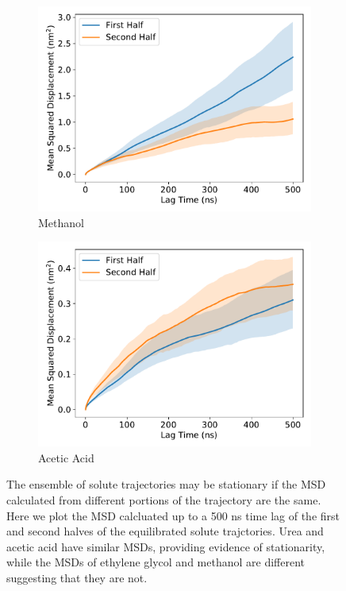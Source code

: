 \documentclass{article}
\begin{document}
\begin{figure}
\begin{subfigure}{0.45\textwidth}
  \end{subfigure}
  \begin{subfigure}{0.45\textwidth}
  \includegraphics[width=\textwidth]{MET_MSD_halves.pdf}
  \caption{Methanol}\label{fig:MET_MSD_halves}
  \end{subfigure}
  \begin{subfigure}{0.45\textwidth}
  \includegraphics[width=\textwidth]{ACH_MSD_halves.pdf}
  \caption{Acetic Acid}\label{fig:ACH_MSD_halves}
  \end{subfigure}
  \caption{The ensemble of solute trajectories may be stationary if the MSD
  calculated from different portions of the trajectory are the same. Here we
  plot the MSD calcluated up to a 500 ns time lag of the first and second
  halves of the equilibrated solute trajctories. Urea and acetic acid have
  similar MSDs, providing evidence of stationarity, while the MSDs of 
  ethylene glycol and methanol are different suggesting that they are not.}\label{fig:msd_comparison}
  \end{figure}
  
\end{document}
